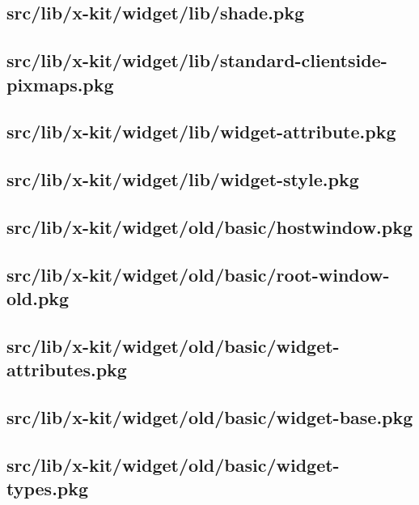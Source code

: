 \subsection{src/lib/x-kit/widget/lib/shade.pkg}


\subsection{src/lib/x-kit/widget/lib/standard-clientside-pixmaps.pkg}


\subsection{src/lib/x-kit/widget/lib/widget-attribute.pkg}


\subsection{src/lib/x-kit/widget/lib/widget-style.pkg}


\subsection{src/lib/x-kit/widget/old/basic/hostwindow.pkg}


\subsection{src/lib/x-kit/widget/old/basic/root-window-old.pkg}


\subsection{src/lib/x-kit/widget/old/basic/widget-attributes.pkg}


\subsection{src/lib/x-kit/widget/old/basic/widget-base.pkg}


\subsection{src/lib/x-kit/widget/old/basic/widget-types.pkg}


